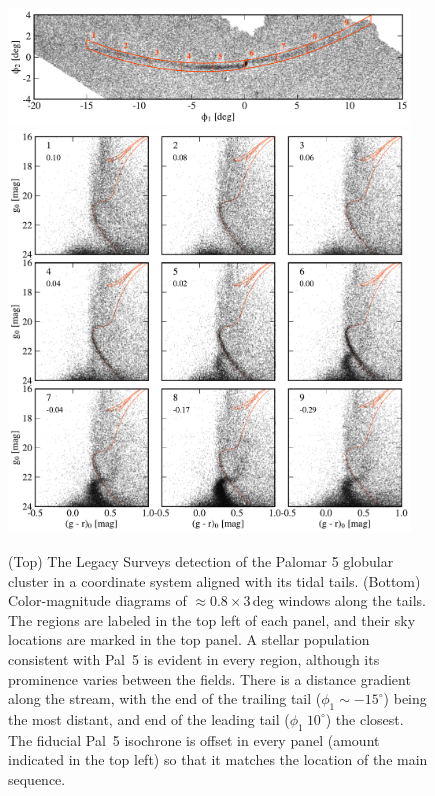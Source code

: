 \documentclass[modern]{aastex62}
\begin{document}
\begin{figure}
\begin{center}
\includegraphics[width=0.95\textwidth]{fig1_a_map.pdf}
\includegraphics[width=0.95\textwidth]{fig1_b_cmds.pdf}
\end{center}
\caption{
(Top) The Legacy Surveys detection of the Palomar 5 globular cluster in a coordinate system aligned with its tidal tails.
(Bottom) Color-magnitude diagrams of $\approx0.8\times3$\,deg windows along the tails.
The regions are labeled in the top left of each panel, and their sky locations are marked in the top panel.
A stellar population consistent with Pal~5 is evident in every region, although its prominence varies between the fields.
There is a distance gradient along the stream, with the end of the trailing tail ($\phi_1\sim-15^\circ$) being the most distant, and end of the leading tail ($\phi_1~10^\circ$) the closest.
The fiducial Pal~5 isochrone is offset in every panel (amount indicated in the top left) so that it matches the location of the main sequence.
}
\label{fig:cmds}
\end{figure}
\end{document}
